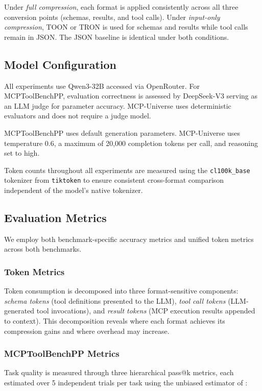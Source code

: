 \documentclass[10pt,twocolumn,letterpaper]{article}
\begin{document}
Under \textit{full compression}, each format is applied consistently across all three conversion points (schemas, results, and tool calls). Under \textit{input-only compression}, TOON or TRON is used for schemas and results while tool calls remain in JSON. The JSON baseline is identical under both conditions.

\subsection{Model Configuration}
\label{sec:model}

All experiments use Qwen3-32B \citep{qwen3_2025} accessed via OpenRouter. For MCPToolBenchPP, evaluation correctness is assessed by DeepSeek-V3 \citep{deepseek_v3_2024} serving as an LLM judge for parameter accuracy. MCP-Universe uses deterministic evaluators and does not require a judge model.

MCPToolBenchPP uses default generation parameters. MCP-Universe uses temperature 0.6, a maximum of 20,000 completion tokens per call, and reasoning set to high.

Token counts throughout all experiments are measured using the \texttt{cl100k\_base} tokenizer from \texttt{tiktoken} to ensure consistent cross-format comparison independent of the model's native tokenizer.

\subsection{Evaluation Metrics}
\label{sec:metrics}

We employ both benchmark-specific accuracy metrics and unified token metrics across both benchmarks.

\subsubsection{Token Metrics}
Token consumption is decomposed into three format-sensitive components: \textit{schema tokens} (tool definitions presented to the LLM), \textit{tool call tokens} (LLM-generated tool invocations), and \textit{result tokens} (MCP execution results appended to context). This decomposition reveals where each format achieves its compression gains and where overhead may increase.

\subsubsection{MCPToolBenchPP Metrics}
Task quality is measured through three hierarchical pass@k metrics, each estimated over 5 independent trials per task using the unbiased estimator of \citet{chen2021evaluating}:
\end{document}
